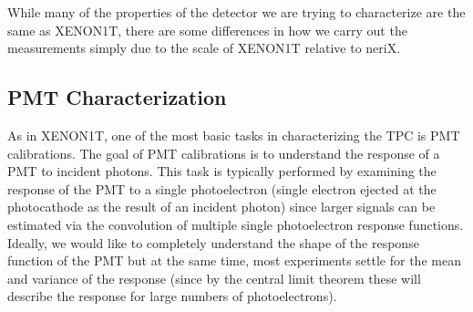 While many of the properties of the detector we are trying to characterize are the same as XENON1T, there are some differences in how we carry out the measurements simply due to the scale of XENON1T relative to neriX.



\subsection{PMT Characterization}

As in XENON1T, one of the most basic tasks in characterizing the TPC is PMT calibrations.  The goal of PMT calibrations is to understand the response of a PMT to incident photons.  This task is typically performed by examining the response of the PMT to a single photoelectron (single electron ejected at the photocathode as the result of an incident photon) since larger signals can be estimated via the convolution of multiple single photoelectron response functions.  Ideally, we would like to completely understand the shape of the response function of the PMT but at the same time, most experiments settle for the mean and variance of the response (since by the central limit theorem these will describe the response for large numbers of photoelectrons).  %

